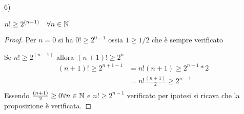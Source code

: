 6)
\begin{thm}
    $\displaystyle n! \geq 2^{(n-1)} \quad \forall n \in \mathbb{N}$
\end{thm}
\begin{proof}
Per $n = 0$ si ha $0! \geq 2^{0-1}$ ossia $ 1 \geq 1/2$ che è sempre verificato

Se $n! \geq 2^{(n-1)}$ allora $(n+1)! \geq 2^n$
\begin{equation*}
\begin{split}
(n+1)! \geq 2^{n+1-1} & = n! (n+1) \geq 2^{n-1} * 2 \\
                      & = n! \frac{(n+1)}{2} \geq 2^{n-1} \\
\end{split}
\end{equation*}
Essendo $\frac{(n+1)}{2} \geq 0 \forall n \in \mathbb{N}$ e $n! \geq 2^{n-1}$ verificato per ipotesi
si ricava che la proposizione è verificata.
\end{proof}
